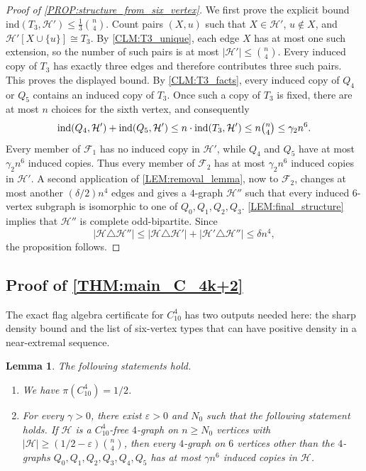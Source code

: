 \documentclass[10pt,a4paper]{article}
\theoremstyle{plain}
\newtheorem{lemma}[lemma]{Lemma}
\theoremstyle{definition}
\newcommand{\ind}{\mathrm{ind}}
\begin{document}
\begin{proof}[Proof of \cref{PROP:structure_from_six_vertex}]
We first prove the explicit bound $\ind(T_3,\mathcal H')\le \frac13\binom n4$. 
Count pairs $(X,u)$ such that $X\in \mathcal H'$, $u\notin X$, and $\mathcal H'[X\cup\{u\}]\cong T_3$.  By \cref{CLM:T3_unique}, each edge $X$ has at most one such extension, so the number of such pairs is at most $|\mathcal H'|\le\binom n4$.  Every induced copy of $T_3$ has exactly three edges and therefore contributes three such pairs.  This proves the displayed bound.
By \cref{CLM:T3_facts}, every induced copy of $Q_4$ or $Q_5$ contains an induced copy of $T_3$.  Once such a copy of $T_3$ is fixed, there are at most $n$ choices for the sixth vertex, and consequently
\[
\ind(Q_4,\mathcal H')+\ind(Q_5,\mathcal H')\le n \cdot \ind(T_3,\mathcal H')\le n\tbinom n4\le \gamma_2 n^6.
\]
Every member of $\mathcal F_1$ has no induced copy in $\mathcal H'$, while $Q_4$ and $Q_5$ have at most $\gamma_2n^6$ induced copies.  Thus every member of $\mathcal F_2$ has at most $\gamma_2n^6$ induced copies in $\mathcal H'$.  A second application of \cref{LEM:removal_lemma}, now to $\mathcal F_2$, changes at most another $(\delta/2)n^4$ edges and gives a $4$-graph $\mathcal H''$ such that every induced $6$-vertex subgraph is isomorphic to one of $Q_0,Q_1,Q_2,Q_3$.  \cref{LEM:final_structure} implies that $\mathcal H''$ is complete odd-bipartite.  Since
\[
|\mathcal H\triangle \mathcal H''|
\le |\mathcal H\triangle \mathcal H'|+|\mathcal H'\triangle \mathcal H''|
\le \delta n^4,
\]
the proposition follows.
\end{proof}

\subsection[Proof of Theorem]{Proof of \texorpdfstring{\cref{THM:main_C_4k+2}}{Theorem}}\label{SEC:C10}

The exact flag algebra certificate for $C_{10}^4$ has two outputs needed here: the sharp density bound and the list of six-vertex types that can have positive density in a near-extremal sequence.

\begin{lemma}\label{LEM:density_C10}\label{LEM:no_6vertex_C10}
The following statements hold.
\begin{enumerate}[label=\textup{(\roman*)}]
\item We have $\pi(C_{10}^{4}) = 1/2$.
\item For every $\gamma > 0$, there exist $\varepsilon > 0$ and $N_0$ such that the following statement holds.  If $\mathcal H$ is a $C_{10}^{4}$-free $4$-graph on $n \ge N_0$ vertices with $|\mathcal H| \ge \left(1/2-\varepsilon\right)\binom{n}{4}$, then every $4$-graph on $6$ vertices other than the $4$-graphs $Q_0,Q_1,Q_2,Q_3,Q_4,Q_5$ has at most $\gamma n^6$ induced copies in $\mathcal H$.
\end{enumerate}
\end{lemma}
\end{document}
